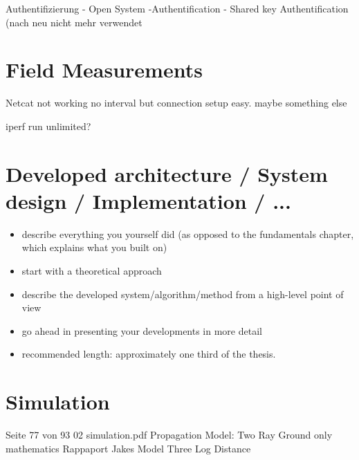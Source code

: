 \documentclass[]{nsm-thesis}
\begin{document}
Authentifizierung
- Open System -Authentification
- Shared key Authentification
(nach neu nicht mehr verwendet

\chapter{Field Measurements}

Netcat not working no interval but connection setup easy. maybe something else

iperf run unlimited? 


\chapter{Developed architecture / System design / Implementation / ...}


\begin{itemize}
\item describe everything you yourself did (as opposed to the fundamentals chapter, which explains what you built on)
\item start with a theoretical approach
\item describe the developed system/algorithm/method from a high-level point of view
\item go ahead in presenting your developments in more detail
\item recommended length: approximately one third of the thesis.
\end{itemize}

\chapter{Simulation}
Seite 77 von 93 02 simulation.pdf
Propagation Model:
 Two Ray Ground only mathematics Rappaport
 Jakes Model
 Three Log Distance
 
\end{document}
